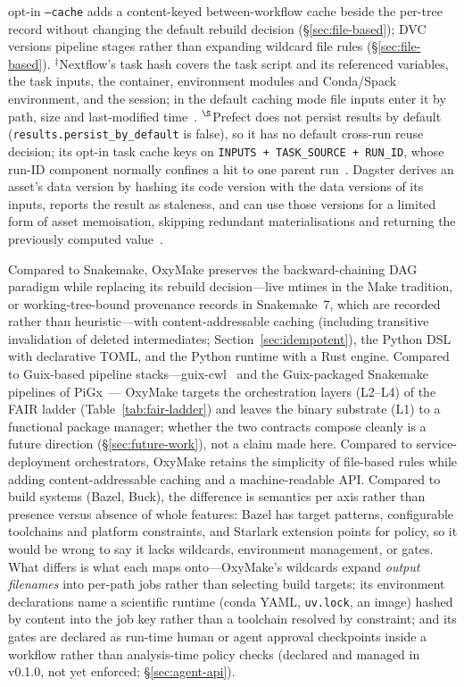 \documentclass[12pt,a4paper]{article}
\newcommand{\code}[1]{{\texttt{\small\color{inlinecode}#1}}}
\begin{document}
\begin{table}[htbp]
{  opt-in \code{--cache} adds a content-keyed between-workflow cache
  beside the per-tree record without changing the default rebuild
  decision (\S\ref{sec:file-based}); DVC versions pipeline stages
  rather than expanding wildcard file rules (\S\ref{sec:file-based}).
  $^{\ddagger}$Nextflow's task hash covers the task script and its
  referenced variables, the task inputs, the container, environment
  modules and Conda/Spack environment, and the session; in the default
  caching mode file inputs enter it by path, size and last-modified
  time~\cite{nextflowCacheResume}.
  $^{\S}$Prefect does not persist results by default
  (\code{results.persist\_by\_default} is false), so it has no default
  cross-run reuse decision; its opt-in task cache keys on
  \code{INPUTS + TASK\_SOURCE + RUN\_ID}, whose run-ID component
  normally confines a hit to one parent run~\cite{prefectCaching}.
  Dagster derives an asset's data version by hashing its code version
  with the data versions of its inputs, reports the result as staleness,
  and can use those versions for a limited form of asset memoisation,
  skipping redundant materialisations and returning the previously
  computed value~\cite{dagsterVersioning}.}
\label{tab:landscape}
\end{table}

Compared
to Snakemake, OxyMake preserves the backward-chaining DAG paradigm while
replacing its rebuild decision---live mtimes in the Make tradition, or
working-tree-bound provenance records in Snakemake~7, which are recorded
rather than heuristic---with
content-addressable caching
(including transitive invalidation of deleted intermediates;
Section~\ref{sec:idempotent}),
the Python DSL with declarative TOML, and the Python runtime with a Rust
engine. Compared to Guix-based pipeline stacks---guix-cwl~\cite{prinsGuixCWLPipelines2018}
and the Guix-packaged Snakemake pipelines of
PiGx~\cite{wurmusPiGxReproducibleGenomics2018}---
OxyMake targets the orchestration layers (L2--L4) of the FAIR ladder
(Table~\ref{tab:fair-ladder}) and leaves the binary substrate (L1) to a
functional package manager; whether the two contracts compose
cleanly is a future direction (\S\ref{sec:future-work}), not a claim
made here.
Compared to service-deployment orchestrators,
OxyMake retains the simplicity of file-based rules while adding
content-addressable caching and a machine-readable API. Compared to build systems
(Bazel, Buck), the difference is semantics per axis rather than
presence versus absence of whole features: Bazel has target patterns,
configurable toolchains and platform constraints, and Starlark
extension points for policy, so it would be wrong to say it lacks
wildcards, environment management, or gates. What differs is what each
maps onto---OxyMake's wildcards expand \emph{output filenames} into
per-path jobs rather than selecting build targets; its environment
declarations name a scientific runtime (conda YAML, \code{uv.lock}, an
image) hashed by content into the job key rather than a toolchain
resolved by constraint; and its gates are declared as run-time human or agent
approval checkpoints inside a workflow rather than analysis-time policy
checks (declared and managed in v0.1.0, not yet enforced;
\S\ref{sec:agent-api}).
\end{document}
